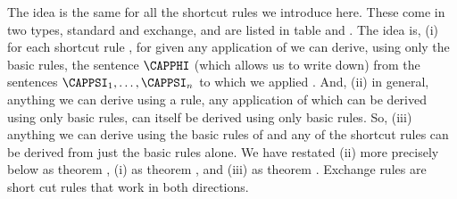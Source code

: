 The idea is the same for all the shortcut rules we introduce here. These come in two types, standard and exchange, and are listed in table  and . The idea is, (i) for each shortcut rule , for given any application of  we can derive, using only the basic rules, the sentence $\CAPPHI$ (which  allows us to write down) from the sentences $\CAPPSI_1,\ldots,\CAPPSI_{\integer{n}}$ to which we applied . 
And, (ii) in general, anything we can derive using a rule, any application of which can be derived using only basic rules, can itself be derived using only basic rules.  
So, (iii) anything we can derive using the basic rules of \GSD{} and any of the shortcut rules can be derived from just the basic rules alone.
We have restated (ii) more precisely below as theorem , (i) as theorem , and (iii) as theorem . 
Exchange rules are short cut rules that work in both directions.

